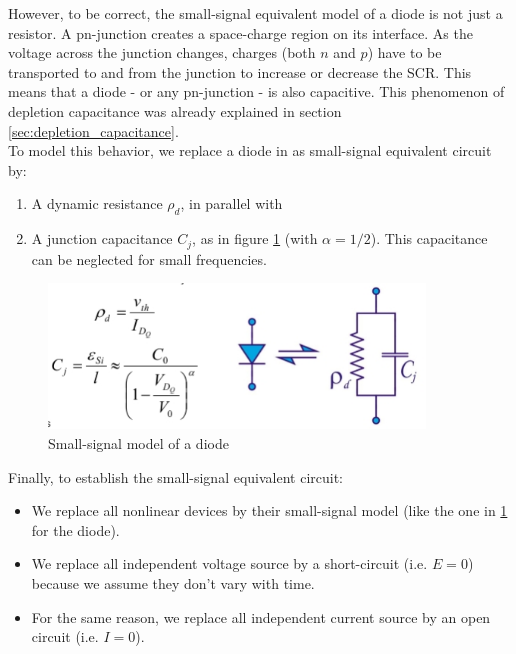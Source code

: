 However, to be correct, the small-signal equivalent model of a diode is not just a resistor. A pn-junction creates a space-charge region on its interface. As the voltage across the junction changes, charges (both $n$ and $p$) have to be transported to and from the junction to increase or decrease the SCR. This means that a diode - or any pn-junction - is also capacitive. This phenomenon of depletion capacitance was already explained in section \ref{sec:depletion_capacitance}.\\
To model this behavior, we replace a diode in as small-signal equivalent circuit by:
\begin{enumerate}
	\item A dynamic resistance $\rho_d$, in parallel with
	\item A junction capacitance $C_j$, as in figure \ref{fig:small_signal_resp8} (with $\alpha=1/2$). This capacitance can be neglected for small frequencies. 
\end{enumerate}
\begin{figure}[h!]
	\centering
	\includegraphics[width=10cm]{figures/ch02/small_signal_resp8.jpg}
	\caption{Small-signal model of a diode}
	\label{fig:small_signal_resp8}
\end{figure}

Finally, to establish the small-signal equivalent circuit:
\begin{itemize}
	\item We replace all nonlinear devices by their small-signal model (like the one in \ref{fig:small_signal_resp8} for the diode).
	\item We replace all independent voltage source by a short-circuit (i.e. $E=0$) because we assume they don't vary with time.
	\item For the same reason, we replace all independent current source by an open circuit (i.e. $I=0$).
\end{itemize}
